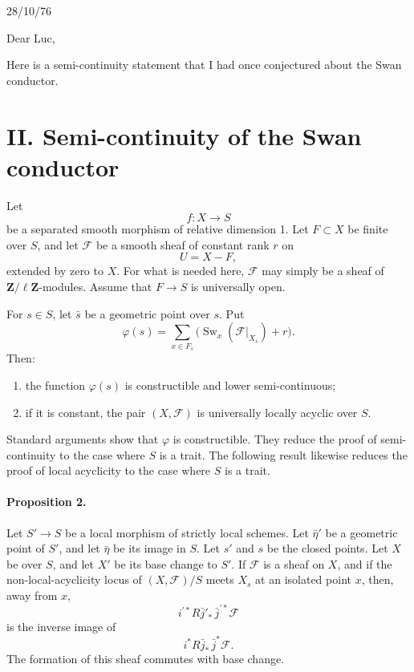 \documentclass[11pt]{article}
\newcommand{\F}{\mathcal F}
\newcommand{\Zell}{\mathbf Z/\ell\mathbf Z}
\DeclareMathOperator{\Sw}{Sw}
\begin{document}
\begin{flushright}
28/10/76
\end{flushright}

Dear Luc,

Here is a semi-continuity statement that I had once conjectured about the Swan conductor.

\section*{II. Semi-continuity of the Swan conductor}

Let
\[
  f:X\longrightarrow S
\]
be a separated smooth morphism of relative dimension 1. Let \(F\subset X\) be finite over \(S\), and let \(\F\) be a smooth sheaf of constant rank \(r\) on
\[
  U=X-F,
\]
extended by zero to \(X\). For what is needed here, \(\F\) may simply be a sheaf of \(\Zell\)-modules. Assume that \(F\to S\) is universally open.

For \(s\in S\), let \(\bar s\) be a geometric point over \(s\). Put
\[
  \varphi(s)=\sum_{x\in F_{\bar s}}
  \bigl(\Sw_x(\F|_{X_{\bar s}})+r\bigr).
\]
Then:
\begin{enumerate}[label=(\roman*)]
\item the function \(\varphi(s)\) is constructible and lower semi-continuous;
\item if it is constant, the pair \((X,\F)\) is universally locally acyclic over \(S\).
\end{enumerate}

Standard arguments show that \(\varphi\) is constructible. They reduce the proof of semi-continuity to the case where \(S\) is a trait. The following result likewise reduces the proof of local acyclicity to the case where \(S\) is a trait.

\paragraph{Proposition 2.}
Let \(S'\to S\) be a local morphism of strictly local schemes. Let \(\bar\eta'\) be a geometric point of \(S'\), and let \(\bar\eta\) be its image in \(S\). Let \(s'\) and \(s\) be the closed points. Let \(X\) be over \(S\), and let \(X'\) be its base change to \(S'\). If \(\F\) is a sheaf on \(X\), and if the non-local-acyclicity locus of \((X,\F)/S\) meets \(X_s\) at an isolated point \(x\), then, away from \(x\),
\[
  i^{\prime *} R\bar j'_{*}\,\bar j^{\prime *}\F
\]
is the inverse image of
\[
  i^{*}R\bar j_{*}\,\bar j^{*}\F.
\]
The formation of this sheaf commutes with base change.
\end{document}
